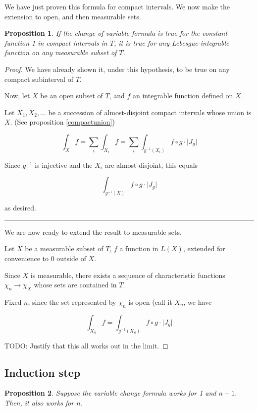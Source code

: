 \documentclass[11pt]{article}
\theoremstyle{definition}
\theoremstyle{plain}
\newtheorem{prop}{Proposition}
\newcommand{\mo}{^{-1}}
\begin{document}
We have just proven this formula for compact intervals. We now make the extension to open, and then measurable sets.

\begin{prop}
If the change of variable formula is true for the constant function 1 in compact intervals in $T$, it is true for any Lebesgue-integrable function on any measurable subset of $T$.
\end{prop}

\begin{proof}
We have already shown it, under this hypothesis, to be true on any compact subinterval of $T$.

Now, let $X$ be an open subset of $T$, and $f$ an integrable function defined on $X$.

Let $X_1, X_2, \ldots$ be a succession of almost-disjoint compact intervals whose union is $X$. (See proposition \ref{compactunion})

\[\int_{X} f = \sum_i \int_{X_i} f = \sum_i \int_{g\mo(X_i)} f \circ g \cdot \lvert J_g \rvert\]

Since $g\mo$ is injective and the $X_i$ are almost-disjoint, this equals

\[\int_{g\mo(X)} f \circ g \cdot \lvert J_g \rvert\]

as desired.

\noindent\rule{\textwidth}{1pt}

We are now ready to extend the result to measurable sets.

Let $X$ be a measurable subset of $T$, $f$ a function in $L(X)$, extended for convenience to 0 outside of $X$.

Since $X$ is measurable, there exists a sequence of characteristic functions $\chi_n \rightarrow \chi_X$ whose sets are contained in $T$.

Fixed $n$, since the set represented by $\chi_n$ is open (call it $X_n$, we have

\[ \int_{X_n} f = \int_{g\mo(X_n)} f \circ g \cdot \lvert J_g \rvert\]

TODO: Justify that this all works out in the limit.
\end{proof}

\subsection{Induction step}

\begin{prop}
Suppose the variable change formula works for 1 and $n-1$. Then, it also works for $n$.
\end{prop}
\end{document}
